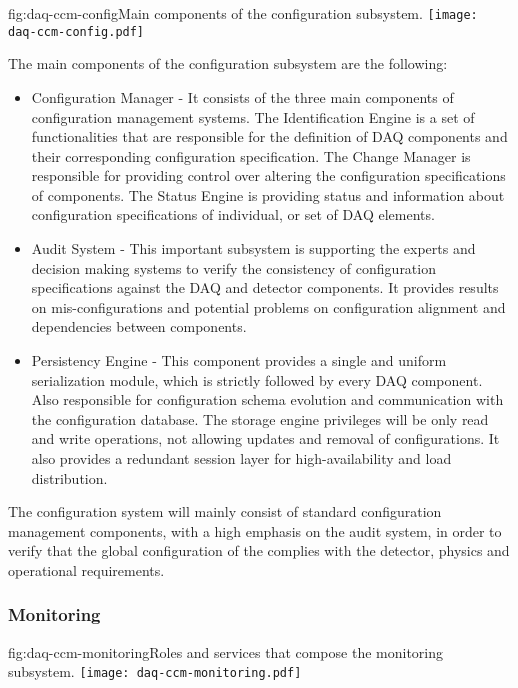 \begin{dunefigure}{fig:daq-ccm-config}{Main components of the  configuration subsystem.}
  \texttt{[image: daq-ccm-config.pdf]}
\end{dunefigure}

The main components of the configuration subsystem are the following:
\begin{itemize}
\item Configuration Manager - It consists of the three main components of configuration management systems. The Identification Engine is a set of functionalities that are responsible for the definition of DAQ components and their corresponding configuration specification. The Change Manager is responsible for providing control over altering the configuration specifications of components. The Status Engine is providing status and information about configuration specifications of individual, or set of DAQ elements.
\item Audit System - This important subsystem is supporting the experts and decision making systems to verify the consistency of configuration specifications against the DAQ and detector components. It provides results on mis-configurations and potential problems on configuration alignment and dependencies between components.
\item Persistency Engine - This component provides a single and uniform serialization module, which is strictly followed by every DAQ component. Also responsible for configuration schema evolution and communication with the configuration database. The storage engine privileges will be only read and write operations, not allowing updates and removal of configurations. It also provides a redundant session layer for high-availability and load distribution.
\end{itemize}

The configuration system will mainly consist of standard configuration management components, with a high emphasis on the audit system, in order to verify that the global configuration of the  complies with the detector, physics and operational requirements.

\subsubsection{Monitoring}
\label{sec:daq:design:ccm:monitoring}

\begin{dunefigure}{fig:daq-ccm-monitoring}{Roles and services that compose the  monitoring subsystem.}
  \texttt{[image: daq-ccm-monitoring.pdf]}
\end{dunefigure}

